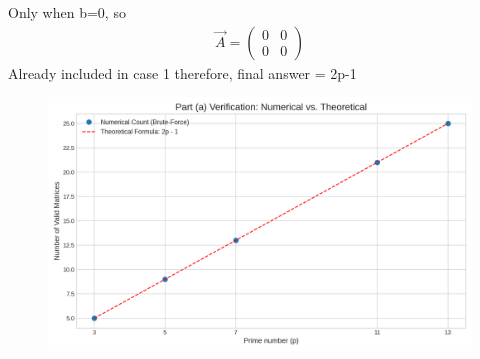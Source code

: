 \documentclass[journal]{IEEEtran}
\begin{document}
Only when b=0, so
\begin{align}
    \vec{A}=\begin{pmatrix}0&0\\0&0\end{pmatrix}
\end{align}
Already included in case 1
therefore, final answer = 2p-1
\begin{figure}[H]
    \centering
    \includegraphics[width=\columnwidth]{figs/figure.png}
    \caption{}
    \label{fig:placeholder}
\end{figure}
\end{document}
